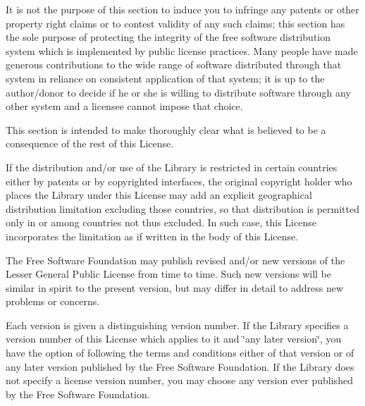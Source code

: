It is not the purpose of this section to induce you to infringe any patents or other property right claims or to contest validity of any such claims; this section has the sole purpose of protecting the integrity of the free software distribution system which is implemented by public license practices. Many people have made generous contributions to the wide range of software distributed through that system in reliance on consistent application of that system; it is up to the author/donor to decide if he or she is willing to distribute software through any other system and a licensee cannot impose that choice.

This section is intended to make thoroughly clear what is believed to be a consequence of the rest of this License.


\begin{DoxyEnumerate}
\item If the distribution and/or use of the Library is restricted in certain countries either by patents or by copyrighted interfaces, the original copyright holder who places the Library under this License may add an explicit geographical distribution limitation excluding those countries, so that distribution is permitted only in or among countries not thus excluded. In such case, this License incorporates the limitation as if written in the body of this License.
\item The Free Software Foundation may publish revised and/or new versions of the Lesser General Public License from time to time. Such new versions will be similar in spirit to the present version, but may differ in detail to address new problems or concerns.
\end{DoxyEnumerate}

Each version is given a distinguishing version number. If the Library specifies a version number of this License which applies to it and \char`\"{}any later version\char`\"{}, you have the option of following the terms and conditions either of that version or of any later version published by the Free Software Foundation. If the Library does not specify a license version number, you may choose any version ever published by the Free Software Foundation.


